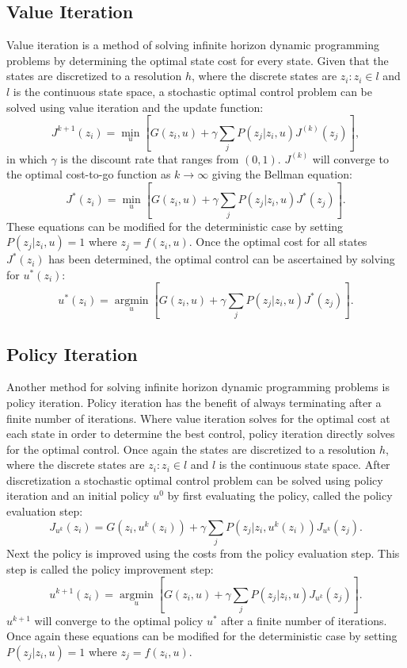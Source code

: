 \subsection{Value Iteration}
Value iteration is a method of solving infinite horizon dynamic programming problems by determining the optimal state cost for every state. Given that the states are discretized to a resolution $h$, where the discrete states are ${z_i:z_i \in l}$ and $l$ is the continuous state space, a stochastic optimal control problem can be solved using value iteration and the update function:
\begin{equation}\label{dpvi}
J^{k+1}(z_i)= \underset{u }{\operatorname{min }}[G(z_i,u) + \gamma \sum_{j}P(z_j|z_i, u)J^{(k)}(z_j)],
\end{equation}
in which $\gamma$ is the discount rate that ranges from $(0,1)$. $J^{(k)}$ will converge to the optimal cost-to-go function as $k \rightarrow \infty$ giving the Bellman equation:
\begin{equation*}
J^*(z_i) = \underset{u }{\operatorname{min }}[G(z_i,u) + \gamma \sum_{j}P(z_j|z_i,u)J^*(z_j)].
\end{equation*}
These equations can be modified for the deterministic case by setting $P(z_j|z_i, u)=1$ where $z_j = f(z_i,u)$. Once the optimal cost for all states $J^*(z_i)$ has been determined, the optimal control can be ascertained by solving for $u^*(z_i)$:
\begin{equation}\label{udpvi}
u^*(z_i) = \underset{u }{\operatorname{arg min }}[G(z_i,u) + \gamma \sum_{j}P(z_j|z_i,u)J^*(z_j)].
\end{equation}      

\subsection{Policy Iteration}
Another method for solving infinite horizon dynamic programming problems is policy iteration. Policy iteration has the benefit of always terminating after a finite number of iterations. Where value iteration solves for the optimal cost at each state in order to determine the best control, policy iteration directly solves for the optimal control. Once again the states are discretized to a resolution $h$, where the discrete states are ${z_i:z_i \in l}$ and $l$ is the continuous state space. After discretization a stochastic optimal control problem can be solved using policy iteration and an initial policy $u^0$ by first evaluating the policy, called the policy evaluation step:
\begin{equation}\label{dppi}
J_{u^k}(z_i)= G(z_i,u^k(z_i)) + \gamma \sum_{j}P(z_j|z_i, u^k(z_i))J_{u^k}(z_j).
\end{equation}
Next the policy is improved using the costs from the policy evaluation step. This step is called the policy improvement step:
\begin{equation}\label{udppi}
u^{k+1}(z_i) = \underset{u }{\operatorname{arg min }}[G(z_i,u) + \gamma \sum_{j}P(z_j|z_i,u)J_{u^k}(z_j)].
\end{equation} 
$u^{k+1}$ will converge to the optimal policy $u^*$ after a finite number of iterations.
Once again these equations can be modified for the deterministic case by setting $P(z_j|z_i, u)=1$ where $z_j = f(z_i,u)$. 